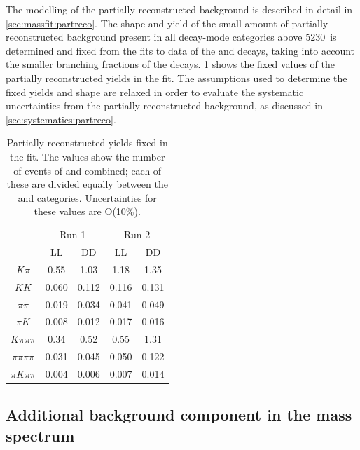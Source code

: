 The modelling of the partially reconstructed background is described in detail in \sect\ref{sec:massfit:partreco}. The shape and yield of the small amount of partially reconstructed background present in all \Dz decay-mode categories above 5230~\mevcc is determined and fixed from the fits to data of the \kpi and \kpipipi decays, taking into account the smaller branching fractions of the \Dz decays. \Tab\ref{partrecofixedyields} shows the fixed values of the partially reconstructed yields in the \CP fit. The assumptions used to determine the fixed yields and shape are relaxed in order to evaluate the systematic uncertainties from the partially reconstructed background, as discussed in \sect\ref{sec:systematics:partreco}. 

\begin{table}[h]
\centering
\begin{tabular}{c|cc|cc}
\hline
& \multicolumn{2}{c}{Run 1} & \multicolumn{2}{c}{Run 2} \\
& LL & DD & LL & DD \\
\hline
$K\pi$ & 0.55 & 1.03 & 1.18 & 1.35 \\
$KK$ & 0.060 & 0.112 & 0.116 & 0.131 \\
$\pi\pi$ & 0.019 & 0.034 & 0.041 & 0.049 \\
$\pi K$ & 0.008 & 0.012 & 0.017 & 0.016 \\
$K\pi\pi\pi$ & 0.34 & 0.52 & 0.55 & 1.31 \\
$\pi\pi\pi\pi$ & 0.031 & 0.045 & 0.050 & 0.122  \\
$\pi K\pi\pi$ & 0.004 & 0.006 & 0.007 & 0.014 \\
\hline
\end{tabular}
\caption{Partially reconstructed yields fixed in the \CP fit. The values show the number of events of \Bp and \Bm combined; each of these are divided equally between the \Bp and \Bm categories. Uncertainties for these values are O(10\%).}
\label{partrecofixedyields}
\end{table}

\subsection{Additional background component in the \kk mass spectrum}
\label{sec:cpfit:Lb2LcKst}

